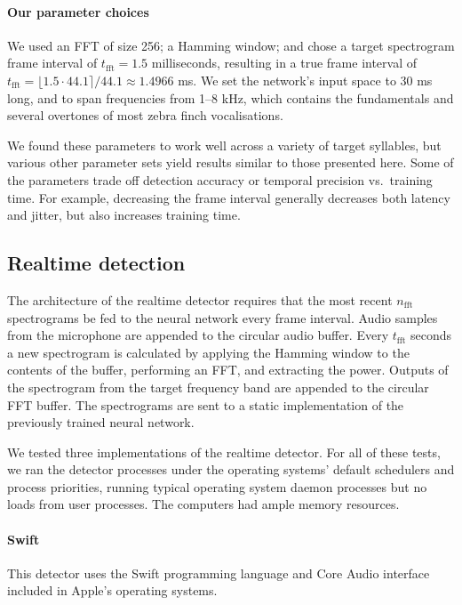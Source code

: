\documentclass[10pt,letterpaper]{article}
\renewcommand{\subsubsection}[1]{\paragraph{#1}}
\begin{document}
\subsubsection{Our parameter choices}

We used an FFT of size 256; a Hamming window; and chose a target
spectrogram frame interval of $t_\textrm{fft}=1.5$ milliseconds,
resulting in a true frame interval of $t_\textrm{fft}=\lfloor 1.5\cdot
44.1\rceil /44.1\approx 1.4966$ ms.  We set the network's input space
to 30 ms long, and to span frequencies from 1--8 kHz, which contains
the fundamentals and several overtones of most zebra finch
vocalisations.

We found these parameters to work well across a variety of target
syllables, but various other parameter sets yield results similar to
those presented here.  Some of the parameters trade off detection
accuracy or temporal precision vs.~training time. For example,
decreasing the frame interval generally decreases both latency and
jitter, but also increases training time.

\subsection{Realtime detection}

The architecture of the realtime detector requires that the most
recent $n_\textrm{fft}$ spectrograms be fed to the neural network
every frame interval.  Audio samples from the microphone are appended
to the circular audio buffer.  Every $t_\textrm{fft}$ seconds a new
spectrogram is calculated by applying the Hamming window to the
contents of the buffer, performing an FFT, and extracting the
power. Outputs of the spectrogram from the target frequency band are
appended to the circular FFT buffer.  The spectrograms are sent to a
static implementation of the previously trained neural network.

We tested three implementations of the realtime detector.  For all of
these tests, we ran the detector processes under the operating
systems' default schedulers and process priorities, running typical
operating system daemon processes but no loads from user processes.
The computers had ample memory resources.

\subsubsection{Swift}

This detector uses the Swift programming language and Core Audio
interface included in Apple's operating systems.
\end{document}
